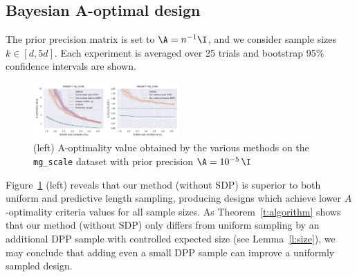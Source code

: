 \subsection{Bayesian A-optimal design}

The prior precision matrix is set to $\A = n^{-1} \I$,
and we consider sample sizes $k \in [d, 5d]$.
Each experiment is averaged over 25 trials and bootstrap 95\% confidence
intervals are shown.


\begin{figure}[htbp]
    \centering
    \includegraphics[width=0.5\textwidth,trim={0 0 10.2cm 0},clip]{../bayesian_figures/mg_combined.pdf}
    \caption{(left) A-optimality value obtained by the various methods on
        the \texttt{mg\_scale} dataset \cite{libsvm} with
        prior precision $\A = 10^{-5}\, \I$
    }
    \label{f:experiments}
\end{figure}

Figure~\ref{f:experiments} (left) reveals that our method (without SDP) is superior
to both uniform and predictive length sampling, producing designs which
achieve lower $A$-optimality criteria values for all sample sizes.
As Theorem~\ref{t:algorithm} shows that our method (without SDP) only differs
from uniform sampling by an additional DPP sample with controlled
expected size (see Lemma~\ref{l:size}), we may conclude
that adding even a small DPP sample can improve a uniformly sampled design.

